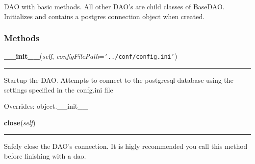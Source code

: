 DAO with basic methods. All other DAO's are child classes of BaseDAO. 
Initializes and contains a postgres connection object when created.



  \subsubsection{Methods}

    \vspace{0.5ex}

\hspace{.8\funcindent}\begin{boxedminipage}{\funcwidth}

    \raggedright \textbf{\_\_init\_\_}(\textit{self}, \textit{configFilePath}={\tt '../conf/config.ini'})

    \vspace{-1.5ex}

    \rule{\textwidth}{0.5\fboxrule}
\setlength{\parskip}{2ex}
    Startup the DAO. Attempts to connect to the postgresql database using 
    the settings specified in the confg.ini file

\setlength{\parskip}{1ex}
      Overrides: object.\_\_init\_\_

    \end{boxedminipage}

    \label{src:dao:base_dao:BaseDAO:close}

    \vspace{0.5ex}

\hspace{.8\funcindent}\begin{boxedminipage}{\funcwidth}

    \raggedright \textbf{close}(\textit{self})

    \vspace{-1.5ex}

    \rule{\textwidth}{0.5\fboxrule}
\setlength{\parskip}{2ex}
    Safely close the DAO's connection. It is higly recommended you call 
    this method before finishing with a dao.

\setlength{\parskip}{1ex}
    \end{boxedminipage}

